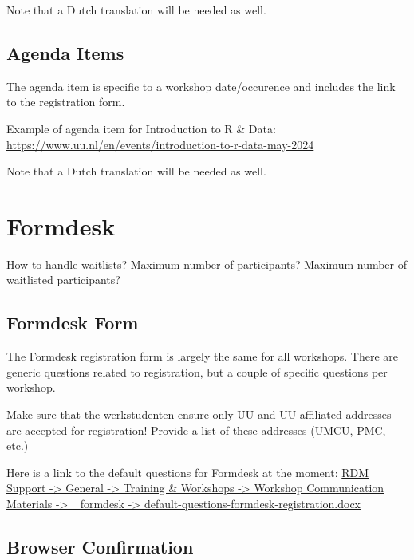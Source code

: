 \documentclass[
  letterpaper,
  DIV=11,
  numbers=noendperiod]{scrreprt}
\begin{document}
Note that a Dutch translation will be needed as well.

\subsection*{Agenda Items}\label{agenda-items}

The agenda item is specific to a workshop date/occurence and includes
the link to the registration form.

Example of agenda item for Introduction to R \& Data:
\url{https://www.uu.nl/en/events/introduction-to-r-data-may-2024}

Note that a Dutch translation will be needed as well.

\section*{Formdesk}\label{formdesk}


How to handle waitlists? Maximum number of participants? Maximum number
of waitlisted participants?

\subsection*{Formdesk Form}\label{formdesk-form}

The Formdesk registration form is largely the same for all workshops.
There are generic questions related to registration, but a couple of
specific questions per workshop.

Make sure that the werkstudenten ensure only UU and UU-affiliated
addresses are accepted for registration! Provide a list of these
addresses (UMCU, PMC, etc.)

Here is a link to the default questions for Formdesk at the moment:
\href{https://solisservices.sharepoint.com/:w:/r/sites/RDMSpeeltuin/Shared\%20Documents/General/Trainings\%20and\%20Workshops/Workshop\%20Communication\%20Materials/_formdesk/default-questions-formdesk-registration.docx?d=wdc1e2777ebe8453bb61f453f106e50fc&csf=1&web=1&e=Vxd94A}{RDM
Support -\textgreater{} General -\textgreater{} Training \& Workshops
-\textgreater{} Workshop Communication Materials -\textgreater{}
\_formdesk -\textgreater{} default-questions-formdesk-registration.docx}

\subsection*{Browser Confirmation}\label{browser-confirmation}
\end{document}
